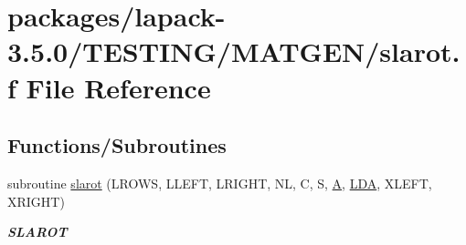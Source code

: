 \hypertarget{slarot_8f}{}\section{packages/lapack-\/3.5.0/\+T\+E\+S\+T\+I\+N\+G/\+M\+A\+T\+G\+E\+N/slarot.f File Reference}
\label{slarot_8f}
\subsection*{Functions/\+Subroutines}
\begin{DoxyCompactItemize}
\item 
subroutine \hyperlink{group__real__matgen_ga5125c93e3ebd59271ad3c5e014e07eae}{slarot} (L\+R\+O\+W\+S, L\+L\+E\+F\+T, L\+R\+I\+G\+H\+T, N\+L, C, S, \hyperlink{classA}{A}, \hyperlink{example__user_8c_ae946da542ce0db94dced19b2ecefd1aa}{L\+D\+A}, X\+L\+E\+F\+T, X\+R\+I\+G\+H\+T)
\begin{DoxyCompactList}\small\item\em {\bfseries S\+L\+A\+R\+O\+T} \end{DoxyCompactList}\end{DoxyCompactItemize}
